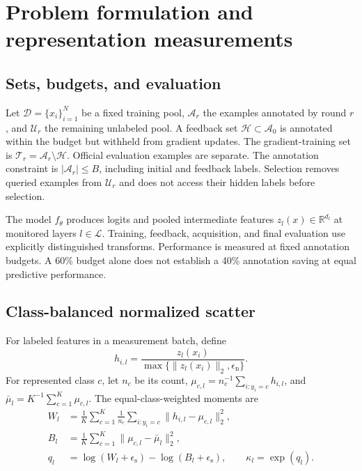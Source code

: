 \documentclass[a4paper,fleqn]{cas-dc}
\newcommand{\R}{\mathbb{R}}
\newcommand{\epss}{\epsilon_{\mathrm{s}}}
\newcommand{\epsn}{\epsilon_{\mathrm{n}}}
\begin{document}
\section{Problem formulation and representation measurements}
\label{sec:geometry}

\subsection{Sets, budgets, and evaluation}

Let $\mathcal D=\{x_i\}_{i=1}^N$ be a fixed training pool,
$\mathcal A_r$ the examples annotated by round $r$, and
$\mathcal U_r$ the remaining unlabeled pool. A feedback set
$\mathcal H\subset\mathcal A_0$ is annotated within the budget but
withheld from gradient updates. The gradient-training set is
$\mathcal T_r=\mathcal A_r\setminus\mathcal H$.
Official evaluation examples are separate. The annotation constraint
is $|\mathcal A_r|\le B$, including initial and feedback labels.
Selection removes queried examples from $\mathcal U_r$ and does
not access their hidden labels before selection.

The model $f_\theta$ produces logits and pooled intermediate features
$z_l(x)\in\R^{d_l}$ at monitored layers $l\in\mathcal L$.
Training, feedback, acquisition, and final evaluation use explicitly
distinguished transforms. Performance is measured at fixed annotation
budgets. A 60\% budget alone does not establish a 40\% annotation
saving at equal predictive performance.

\subsection{Class-balanced normalized scatter}

For labeled features in a measurement batch, define
\begin{equation}
 h_{i,l}=\frac{z_l(x_i)}
 {\max\{\|z_l(x_i)\|_2,\epsn\}}.
 \label{eq:normalized_features}
\end{equation}
For represented class $c$, let $n_c$ be its count,
$\mu_{c,l}=n_c^{-1}\sum_{i:y_i=c}h_{i,l}$, and
$\bar\mu_l=K^{-1}\sum_{c=1}^K\mu_{c,l}$.
The equal-class-weighted moments are
\begin{align}
 W_l &=
 \frac1K\sum_{c=1}^K\frac1{n_c}
 \sum_{i:y_i=c}\|h_{i,l}-\mu_{c,l}\|_2^2,\\
 B_l &=
 \frac1K\sum_{c=1}^K\|\mu_{c,l}-\bar\mu_l\|_2^2,\\
 q_l &=\log(W_l+\epss)-\log(B_l+\epss),
 \qquad \kappa_l=\exp(q_l).
 \label{eq:trace_ratio}
\end{align}
\end{document}
